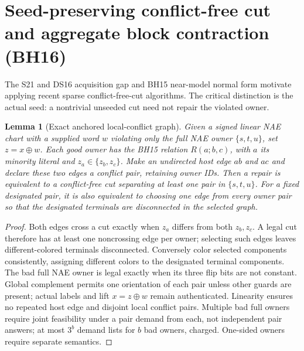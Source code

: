 \documentclass[11pt]{article}
\newtheorem{lemma}[theorem]{Lemma}
\begin{document}
\section{Seed-preserving conflict-free cut and aggregate block contraction (BH16)}\label{sec:bh16}
The S21 and DS16 acquisition gap and BH15 near-model normal form motivate applying recent sparse conflict-free-cut algorithms. The critical distinction is the actual seed: a nontrivial unseeded cut need not repair the violated owner.

\begin{lemma}[Exact anchored local-conflict graph]\label{lem:bh16-cut}
Given a signed linear NAE chart with a supplied word $w$ violating only the full NAE owner $\{s,t,u\}$, set $z=x\oplus w$. Each good owner has the BH15 relation $R(a;b,c)$, with $a$ its minority literal and $z_a\in\{z_b,z_c\}$. Make an undirected host edge $ab$ and $ac$ and declare these two edges a conflict pair, retaining owner IDs. Then a repair is equivalent to a conflict-free cut separating at least one pair in $\{s,t,u\}$. For a fixed designated pair, it is also equivalent to choosing one edge from every owner pair so that the designated terminals are disconnected in the selected graph.
\end{lemma}
\begin{proof}
Both edges cross a cut exactly when $z_a$ differs from both $z_b,z_c$. A legal cut therefore has at least one noncrossing edge per owner; selecting such edges leaves different-colored terminals disconnected. Conversely color selected components consistently, assigning different colors to the designated terminal components. The bad full NAE owner is legal exactly when its three flip bits are not constant. Global complement permits one orientation of each pair unless other guards are present; actual labels and lift $x=z\oplus w$ remain authenticated. Linearity ensures no repeated host edge and disjoint local conflict pairs. Multiple bad full owners require joint feasibility under a pair demand from each, not independent pair answers; at most $3^b$ demand lists for $b$ bad owners, charged. One-sided owners require separate semantics.
\end{proof}
\end{document}
